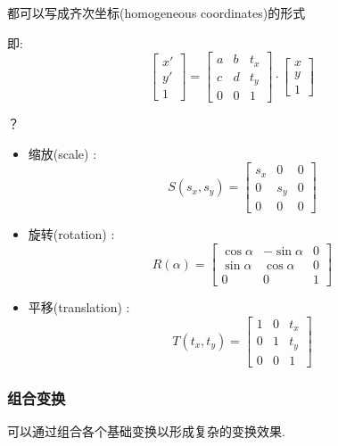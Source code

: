 \documentclass[UTF8,12pt]{ctexbook}
\begin{document}
{{{{        都可以写成齐次坐标(homogeneous coordinates)的形式

        即:
        $$\begin{bmatrix}
            x\prime \\
            y\prime \\
            1
          \end{bmatrix}
          =
          \begin{bmatrix}
            a & b & t_x \\
            c & d & t_y \\
            0 & 0 & 1
          \end{bmatrix}
          \cdot
          \begin{bmatrix}
            x \\
            y \\
            1
          \end{bmatrix}$$

        {？}
        \begin{itemize}
          \item 缩放(scale) : $$S(s_x, s_y) = \begin{bmatrix}
                    s_x & 0   & 0 \\
                    0   & s_y & 0 \\
                    0   & 0   & 0
                  \end{bmatrix}$$
          \item 旋转(rotation) : $$R(\alpha) = \begin{bmatrix}
                    \cos\alpha & -\sin\alpha & 0 \\
                    \sin\alpha & \cos\alpha  & 0 \\
                    0          & 0           & 1
                  \end{bmatrix}$$
          \item 平移(translation) : $$T(t_x, t_y) = \begin{bmatrix}
                    1 & 0 & t_x \\
                    0 & 1 & t_y \\
                    0 & 0 & 1
                  \end{bmatrix}$$
        \end{itemize}

      }%

      \subsubsection{组合变换}{
        可以通过组合各个基础变换以形成复杂的变换效果.

}}}}
\end{document}
